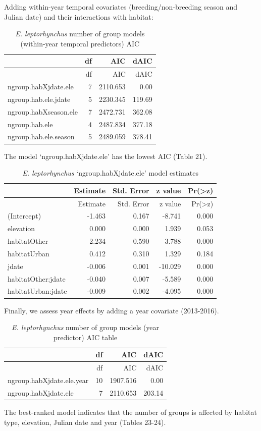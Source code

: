 \documentclass[]{article}
\begin{document}
Adding within-year temporal covariates (breeding/non-breeding season and
Julian date) and their interactions with habitat:

\begin{longtable}[]{@{}lrrr@{}}
\caption{\textit{E. leptorhynchus} number of group models (within-year
temporal predictors) AIC}\tabularnewline
\toprule
& df & AIC & dAIC\tabularnewline
\midrule
\endfirsthead
\toprule
& df & AIC & dAIC\tabularnewline
\midrule
\endhead
ngroup.habXjdate.ele & 7 & 2110.653 & 0.00\tabularnewline
ngroup.hab.ele.jdate & 5 & 2230.345 & 119.69\tabularnewline
ngroup.habXseason.ele & 7 & 2472.731 & 362.08\tabularnewline
ngroup.hab.ele & 4 & 2487.834 & 377.18\tabularnewline
ngroup.hab.ele.season & 5 & 2489.059 & 378.41\tabularnewline
\bottomrule
\end{longtable}

The model `ngroup.habXjdate.ele' has the lowest AIC (Table 21).

\begin{longtable}[]{@{}lrrrr@{}}
\caption{\textit{E. leptorhynchus} `ngroup.habXjdate.ele' model
estimates}\tabularnewline
\toprule
& Estimate & Std. Error & z value &
Pr(\textgreater{}\textbar{}z\textbar{})\tabularnewline
\midrule
\endfirsthead
\toprule
& Estimate & Std. Error & z value &
Pr(\textgreater{}\textbar{}z\textbar{})\tabularnewline
\midrule
\endhead
(Intercept) & -1.463 & 0.167 & -8.741 & 0.000\tabularnewline
elevation & 0.000 & 0.000 & 1.939 & 0.053\tabularnewline
habitatOther & 2.234 & 0.590 & 3.788 & 0.000\tabularnewline
habitatUrban & 0.412 & 0.310 & 1.329 & 0.184\tabularnewline
jdate & -0.006 & 0.001 & -10.029 & 0.000\tabularnewline
habitatOther:jdate & -0.040 & 0.007 & -5.589 & 0.000\tabularnewline
habitatUrban:jdate & -0.009 & 0.002 & -4.095 & 0.000\tabularnewline
\bottomrule
\end{longtable}

Finally, we assess year effects by adding a year covariate (2013-2016).

\begin{longtable}[]{@{}lrrr@{}}
\caption{\textit{E. leptorhynchus} number of group models (year
predictor) AIC table}\tabularnewline
\toprule
& df & AIC & dAIC\tabularnewline
\midrule
\endfirsthead
\toprule
& df & AIC & dAIC\tabularnewline
\midrule
\endhead
ngroup.habXjdate.ele.year & 10 & 1907.516 & 0.00\tabularnewline
ngroup.habXjdate.ele & 7 & 2110.653 & 203.14\tabularnewline
\bottomrule
\end{longtable}

The best-ranked model indicates that the number of groups is affected by
habitat type, elevation, Julian date and year (Tables 23-24).
\end{document}
